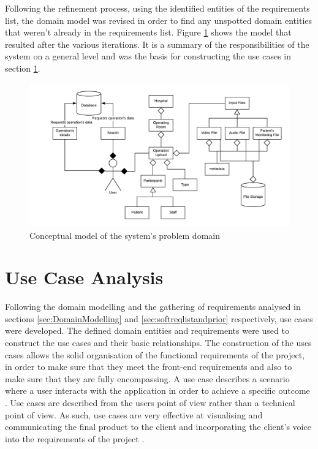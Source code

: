 Following the refinement process, using the identified entities of the requirements list, the domain model was revised in order to find any unspotted domain entities that weren't already in the requirements list. 
Figure \ref{domain_model} shows the model that resulted after the various iterations. It is a summary of the responsibilities of the system on a general level and was the basis for constructing the use cases in section \ref{use_case_analysis}.

\begin{figure}[h]
\begin{center}
\includegraphics[width=17cm]{imgs/Domain_Model.png}
\end{center}\vspace{-0.3cm}
\caption[Domain Model]{Conceptual model of the system's problem domain} \label{domain_model}
\end{figure}



\section{Use Case Analysis}
\label{use_case_analysis}

Following the domain modelling and the gathering of requirements analysed in sections \ref{sec:DomainModelling} and \ref{sec:softreqlistandprior} respectively, use cases were developed. The defined domain entities and requirements were used to construct the use cases and their basic relationships. The construction of the uses cases allows the solid organisation of the functional requirements of the project, in order to make sure that they meet the front-end requirements and also to make sure that they are fully encompassing. A use case describes a scenario where a user interacts with the application in order to achieve a specific outcome \cite{usecases3}. Use cases are described from the users point of view rather than a technical point of view. As such, use cases are very effective at visualising and communicating the final product to the client and incorporating the client's voice into the requirements of the project \cite{usecases2}.

